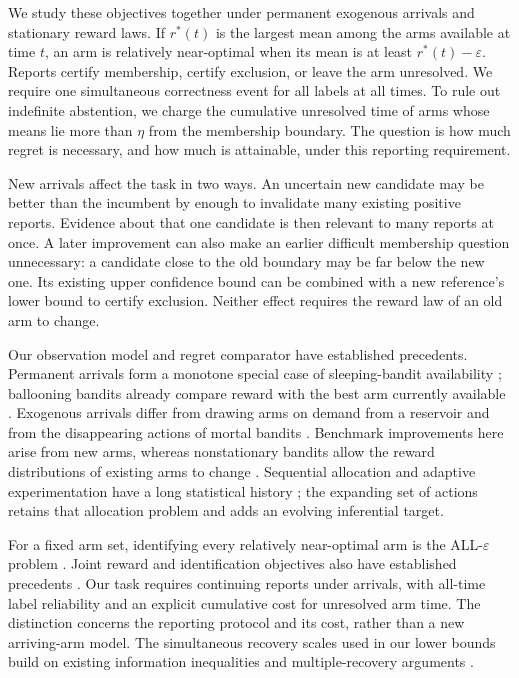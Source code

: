 \documentclass[11pt]{article}
\theoremstyle{remark}
\begin{document}
We study these objectives together under permanent exogenous arrivals and
stationary reward laws. If $r^*(t)$ is the largest mean among the arms
available at time $t$, an arm is relatively near-optimal when its mean is at
least $r^*(t)-\varepsilon$. Reports certify membership, certify exclusion, or
leave the arm unresolved. We require one simultaneous correctness event for
all labels at all times. To rule out indefinite abstention, we charge the
cumulative unresolved time of arms whose means lie more than $\eta$ from
the membership boundary. The question is how much regret is necessary, and
how much is attainable, under this reporting requirement.

New arrivals affect the task in two ways. An uncertain new candidate may be
better than the incumbent by enough to invalidate many existing positive
reports. Evidence about that one candidate is then relevant to many
reports at once. A later improvement can also make an earlier difficult
membership question unnecessary: a candidate close to the old boundary may
be far below the new one. Its existing upper confidence bound can be
combined with a new reference's lower bound to certify exclusion. Neither
effect requires the reward law of an old arm to change.

Our observation model and regret comparator have established precedents.
Permanent arrivals form a monotone special case of sleeping-bandit
availability \citep{kleinberg2010}; ballooning bandits already compare reward
with the best arm currently available \citep{ghalme2021}. Exogenous arrivals
differ from drawing arms on demand from a reservoir
\citep{10.1214/aos/1069362389} and from the disappearing actions of mortal
bandits \citep{NIPS2008_788d9869}. Benchmark improvements here arise from new
arms, whereas nonstationary bandits allow the reward distributions of
existing arms to change \citep{Besbes2014,Auer2019ADSWITCH}. Sequential
allocation and adaptive experimentation have a long statistical history
\citep{Robbins1952,LAI19854,Lai1987}; the expanding set of actions retains
that allocation problem and adds an evolving inferential target.

For a fixed arm set, identifying every relatively near-optimal arm is the
ALL-$\varepsilon$ problem \citep{mason2020}. Joint reward and identification
objectives also have established precedents
\citep{degenne2019,yang2026,cho2025}. Our task requires continuing reports
under arrivals, with all-time label reliability and an explicit cumulative
cost for unresolved arm time. The distinction concerns the reporting
protocol and its cost, rather than a new arriving-arm model. The simultaneous
recovery scales used in our lower bounds build on existing information
inequalities and multiple-recovery arguments
\citep{kaufmann2016,malloy2014,jamieson2018}.
\end{document}
